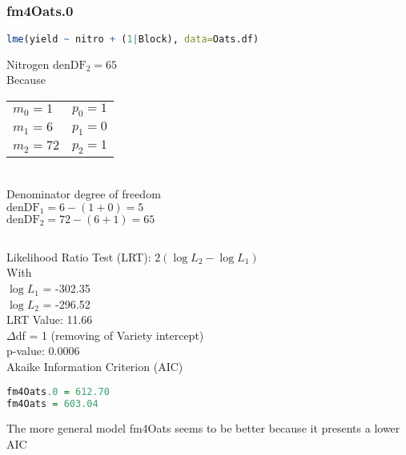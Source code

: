 \documentclass[a4paper,12pt]{article}
\begin{document}
		\subsection{}
				\subsubsection*{fm4Oats.0}
		\begin{lstlisting}[language=R]
lme(yield ~ nitro + (1|Block), data=Oats.df)
		\end{lstlisting}
	
		Nitrogen $\text{denDF}_2 = 65$\\
		
		Because\\[1mm]
		\begin{tabular}{m{9cm}m{5cm}}
			$m_0 = 1$ & $p_0 = 1$ \\
			$m_1 = 6$ & $p_1 = 0$ \\
			$m_2 = 72$ & $p_2 = 1$
		\end{tabular}\\
		
		Denominator degree of freedom\\[1mm]
		$\text{denDF}_1 = 6 - (1 + 0) = 5$\\
		$\text{denDF}_2 = 72 - (6 + 1) = 65$\\[2em]
		
		\subsection{}
		Likelihood Ratio Test (LRT): $2\left(\log L_2 - \log L_1\right)$\\
		
		With\\[1mm]
		$\log L_1$ = -302.35\\
		$\log L_2$ = -296.52\\
		
		LRT Value: 11.66\\
		$\Delta$df = 1 (removing of Variety intercept)\\
		p-value: 0.0006\\
		
		Akaike Information Criterion (AIC)\\[1mm]
		\begin{lstlisting}[language=R]
fm4Oats.0 = 612.70
fm4Oats = 603.04
		\end{lstlisting}
		The more general model fm4Oats seems to be better because it presents a lower AIC
		
\end{document}
